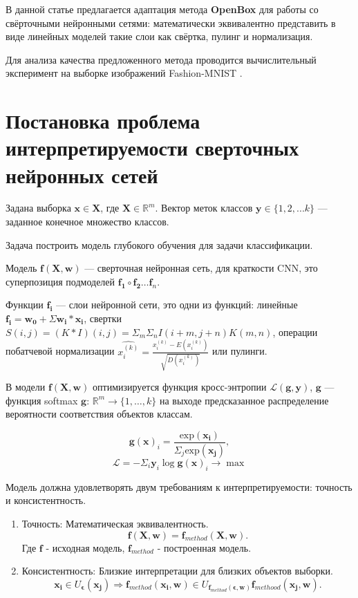 \documentclass[12pt]{article}
\begin{document}
В данной статье предлагается адаптация метода \textbf{OpenBox} для работы со свёрточными нейронными сетями: математически эквивалентно представить в виде линейных моделей такие слои как свёртка, пулинг и нормализация.

Для анализа качества предложенного метода проводится вычислительный эксперимент на выборке изображений Fashion-MNIST \citep{fashionmnist}.



\section{Постановка проблема интерпретируемости сверточных нейронных сетей}
\label{sec:headings}

Задана выборка $\mathbf{x} \in \mathbf{X}$, где $\mathbf{X} \in \mathbb{R}^m$. Вектор меток классов $\mathbf{y} \in \{1, 2, ... k\}$ --- заданное конечное множество классов.

Задача построить модель глубокого обучения для задачи классификации.

Модель $\mathbf{f}(\mathbf{X}, \mathbf{w})$ --- сверточная нейронная сеть, для краткости CNN, это суперпозиция подмоделей $\mathbf{f_1} \circ \mathbf{f_2} \dots \mathbf{f}_n$.

Функции $\mathbf{f_i}$ --- слои нейронной сети, это одни из функций: линейные $\mathbf{f_i} = \mathbf{w_0} + \Sigma \mathbf{w_i} * \mathbf{x_i}$, свертки $S(i,j) = (K * I)(i,j) = \Sigma_m \Sigma_n I(i + m, j + n)K(m, n)$, операции побатчевой нормализации $\hat{x_i^{(k)}} = \frac{x_i^{(k)} - E(x_i^{(k)})}{\sqrt{D(x_i^{(k)})}}$ или пулинги.

В модели $\mathbf{f}(\mathbf{X}, \mathbf{w})$ оптимизируется функция кросс-энтропии $\mathcal{L}(\mathbf{g}, \mathbf{y})$, $\mathbf{g}$ --- функция softmax $\mathbf{g}$: $\mathbb{R}^m \to \{1,\dots,k\}$ на выходе предсказанное распределение вероятности соответствия объектов классам.

$$\mathbf{g}(\mathbf{x})_i = \frac{\text{exp}(\mathbf{x_i})}{\Sigma_j \text{exp}(\mathbf{x_j})},$$
$$\mathcal{L} = -\Sigma_i \mathbf{y}_i \log \mathbf{g}(\mathbf{x})_i\to \max$$

Модель должна удовлетворять двум требованиям к интерпретируемости: $\textbf{точность}$ и $\textbf{консистентность}$.
\begin{enumerate}
   \item{Точность}:
    Математическая эквивалентность.
    $$\mathbf{f}(\mathbf{X}, \mathbf{w}) = \mathbf{f}_{method}(\mathbf{X}, \mathbf{w}).$$ Где $\mathbf{f}$ - исходная модель, $\mathbf{f}_{method}$ - построенная модель.
    \item{Консистентность}:
    Близкие интерпретации для близких объектов выборки. $$\mathbf{x_i} \in U_\mathbf{\epsilon}(\mathbf{x_j}) \Longrightarrow \mathbf{f}_{method}(\mathbf{x_i}, \mathbf{w}) \in U_{\mathbf{f}_{method}(\mathbf{\epsilon}, \mathbf{w})}\mathbf{f}_{methood}(\mathbf{x_j}, \mathbf{w}).$$
\end{enumerate}
\end{document}
